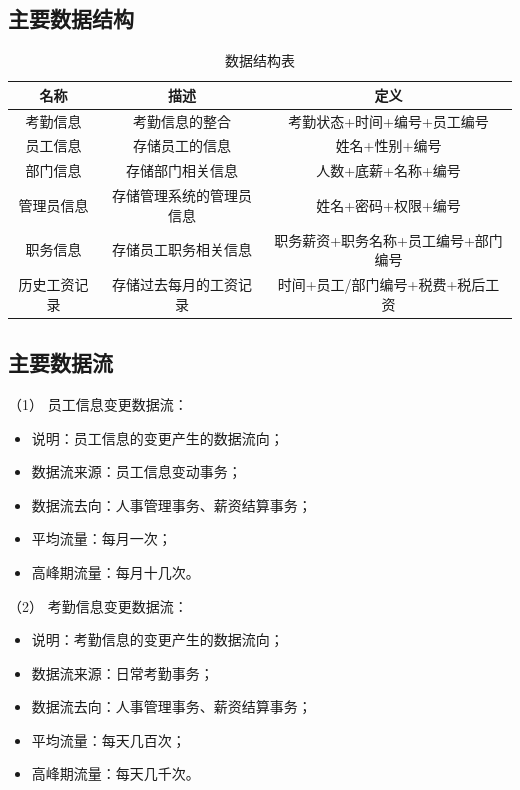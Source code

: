 \documentclass[withoutpreface,bwprint]{cumcmthesis} %
\newcommand{\kuohao}[1]{ \noindent （#1）}
\begin{document}
\subsection{主要数据结构}
\begin{table}[H]
\centering
\caption{数据结构表}
\label{t2}
\begin{tabular}{ccc}
\hline
\textbf{名称} & \textbf{描述}  & \textbf{定义}         \\ \hline
考勤信息        & 考勤信息的整合      & 考勤状态+时间+编号+员工编号     \\ \hline
员工信息        & 存储员工的信息      & 姓名+性别+编号            \\ \hline
部门信息        & 存储部门相关信息     & 人数+底薪+名称+编号         \\ \hline
管理员信息       & 存储管理系统的管理员信息 & 姓名+密码+权限+编号         \\ \hline
职务信息        & 存储员工职务相关信息   & 职务薪资+职务名称+员工编号+部门编号 \\ \hline
历史工资记录    &存储过去每月的工资记录 & 时间+员工/部门编号+税费+税后工资                    \\ \hline
\end{tabular}
\end{table}
\subsection{主要数据流}
\kuohao{1} 员工信息变更数据流：
\begin{itemize}
\item 说明：员工信息的变更产生的数据流向；
\item 数据流来源：员工信息变动事务；
\item 数据流去向：人事管理事务、薪资结算事务；
\item 平均流量：每月一次；
\item 高峰期流量：每月十几次。
\end{itemize}

\kuohao{2} 考勤信息变更数据流：
\begin{itemize}
\item 说明：考勤信息的变更产生的数据流向；
\item 数据流来源：日常考勤事务；
\item 数据流去向：人事管理事务、薪资结算事务；
\item 平均流量：每天几百次；
\item 高峰期流量：每天几千次。
\end{itemize}
\end{document}
